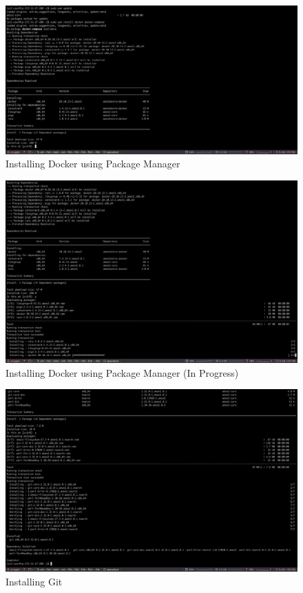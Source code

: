 \begin{figure}[H]
    \centering
        \includegraphics[width=\textwidth]{resources/installing-docker.png}
    \caption{Installing Docker using Package Manager}
    \label{fig:installing-docker}
\end{figure}

\begin{figure}[H]
    \centering
        \includegraphics[width=\textwidth]{resources/installing-docker-2.png}
    \caption{Installing Docker using Package Manager (In Progress)}
    \label{fig:installing-docker-2}
\end{figure}

\begin{figure}[H]
    \centering
        \includegraphics[width=\textwidth]{resources/installing-docker-3.png}
    \caption{Installing Git}
    \label{fig:installing-docker-3}
\end{figure}


